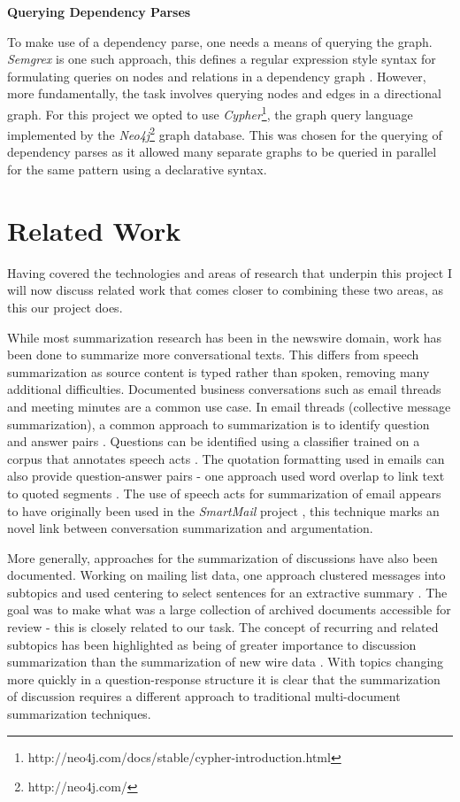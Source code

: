       \noindent\textbf{Querying Dependency Parses}

        \noindent To make use of a dependency parse, one needs a means of querying the graph. \textit{Semgrex} is one such approach, this defines a regular expression style syntax for formulating queries on nodes and relations in a dependency graph \cite{Chambers2007}. However, more fundamentally, the task involves querying nodes and edges in a directional graph. For this project we opted to use \textit{Cypher}\footnote{http://neo4j.com/docs/stable/cypher-introduction.html}, the graph query language implemented by the \textit{Neo4j}\footnote{http://neo4j.com/} graph database. This was chosen for the querying of dependency parses as it allowed many separate graphs to be queried in parallel for the same pattern using a declarative syntax.

  \section{Related Work}
    Having covered the technologies and areas of research that underpin this project I will now discuss related work that comes closer to combining these two areas, as this our project does.

    While most summarization research has been in the newswire domain, work has been done to summarize more conversational texts. This differs from speech summarization as source content is typed rather than spoken, removing many additional difficulties. Documented business conversations such as email threads and meeting minutes are a common use case. In email threads (collective message summarization), a common approach to summarization is to identify question and answer pairs \cite{shrestha2007using,shrestha2004detection,carenini2007summarizing}. Questions can be identified using a classifier trained on a corpus that annotates speech acts \cite{shrestha2004detection}. The quotation formatting used in emails can also provide question-answer pairs - one approach used word overlap to link text to quoted segments \cite{carenini2007summarizing}. The use of speech acts for summarization of email appears to have originally been used in the \textit{SmartMail} project \cite{corston2004task}, this technique marks an novel link between conversation summarization and argumentation.

    More generally, approaches for the summarization of discussions have also been documented. Working on mailing list data, one approach clustered messages into subtopics and used centering to select sentences for an extractive summary \cite{newman2003summarizing}. The goal was to make what was a large collection of archived documents accessible for review - this is closely related to our task. The concept of recurring and related subtopics has been highlighted as being of greater importance to discussion summarization than the summarization of new wire data \cite{zhou2006summarization}. With topics changing more quickly in a question-response structure it is clear that the summarization of discussion requires a different approach to traditional multi-document summarization techniques.

